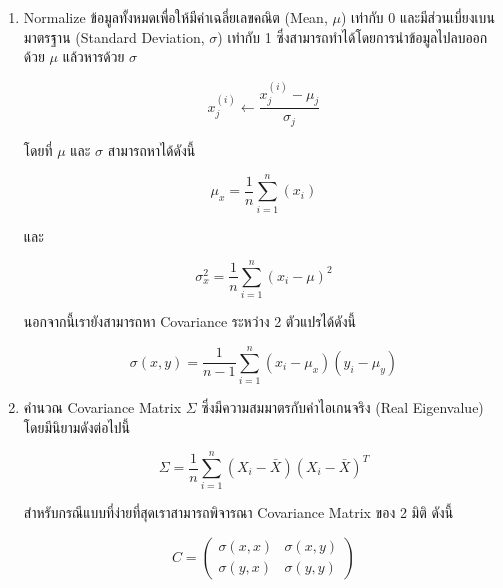 \begin{enumerate}
    \item Normalize ข้อมูลทั้งหมดเพื่อให้มีค่าเฉลี่ยเลขคณิต (Mean, $\mu$) เท่ากับ 0 และมีส่วนเบี่ยงเบนมาตรฐาน (Standard Deviation, 
    $\sigma$) เท่ากับ 1 ซึ่งสามารถทำได้โดยการนำข้อมูลไปลบออกด้วย $\mu$ แล้วหารด้วย $\sigma$

    \begin{equation}\label{eq:normalize}
        x^{(i)}_{j} \leftarrow \frac{x^{(i)}_{j} - \mu_{j}}{\sigma_{j}}
    \end{equation}

    \noindent โดยที่ $\mu$ และ $\sigma$ สามารถหาได้ดังนี้

    \begin{equation}\label{eq:mean}
        \mu_{x} = \frac{1}{n} \sum^{n}_{i=1}(x_{i})
    \end{equation}

    \noindent และ

    \begin{equation}\label{eq:variance}
        \sigma^2_{x} = \frac{1}{n} \sum^{n}_{i=1}(x_{i} - \mu)^2 
    \end{equation}

    \noindent นอกจากนี้เรายังสามารถหา Covariance ระหว่าง 2 ตัวแปรได้ดังนี้

    \begin{equation}\label{eq:covariance}
        \sigma(x, y) = \frac{1}{n-1} \sum^{n}_{i=1}{(x_i - \mu_{x})(y_i - \mu_{y})}
    \end{equation}

    \item คำนวณ Covariance Matrix $\Sigma$ ซึ่งมีความสมมาตรกับค่าไอเกนจริง (Real Eigenvalue) โดยมีนิยามดังต่อไปนี้

    \begin{equation}
        \Sigma = \frac{1}{n} \sum^{n}_{i=1}{(X_i-\bar{X})(X_i-\bar{X})^T}
    \end{equation}

    \noindent สำหรับกรณีแบบที่ง่ายที่สุดเราสามารถพิจารณา Covariance Matrix ของ 2 มิติ ดังนี้

    \begin{equation}\label{eq:cov_mat_2d}
        C = \left( \begin{array}{ccc}  \sigma(x, x) & \sigma(x, y) \\  
            \sigma(y, x) & \sigma(y, y) \end{array} \right)
    \end{equation}


\end{enumerate}
